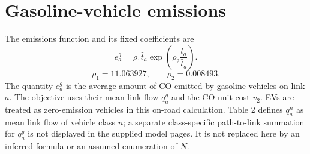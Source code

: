 \documentclass{article}
\begin{document}
\section*{Gasoline-vehicle emissions}
The emissions function and its fixed coefficients are
\begin{equation}
e_a^g=\rho_1\hat t_a\exp\left(\rho_2\frac{l_a}{\hat t_a}\right).\tag{13}
\end{equation}
\[
\rho_1=11.063927,\qquad \rho_2=0.008493.
\]
The quantity $e_a^g$ is the average amount of CO emitted by gasoline vehicles on link $a$. The objective uses their mean link flow $q_a^g$ and the CO unit cost $v_2$. EVs are treated as zero-emission vehicles in this on-road calculation. Table 2 defines $q_a^n$ as mean link flow of vehicle class $n$; a separate class-specific path-to-link summation for $q_a^g$ is not displayed in the supplied model pages. It is not replaced here by an inferred formula or an assumed enumeration of $N$.
\end{document}
